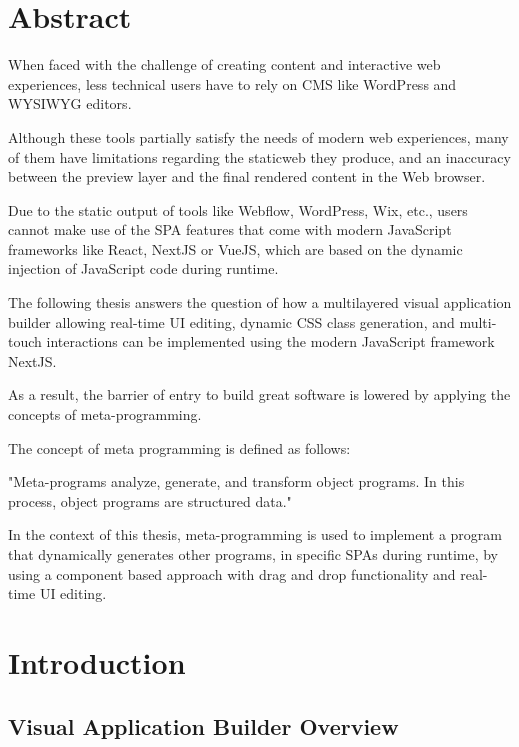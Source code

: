 \documentclass[oneside,11pt]{book}
\let\oldmainmatter\mainmatter
\renewcommand{\mainmatter}{
  \oldmainmatter
  \pagestyle{mainmatter}
}
\begin{document}
\chapter*{Abstract}

When faced with the challenge of creating content and interactive web experiences, less technical users have to rely on \gls{CMS} like WordPress and \gls{WYSIWYG} editors.


Although these tools partially satisfy the needs of modern web experiences, many of them have limitations regarding the \gls{staticweb} they produce, and an inaccuracy between the preview layer and the final rendered content in the Web browser.


Due to the static output of tools like Webflow, WordPress, Wix, etc., users cannot make use of the \gls{SPA} features that come with modern JavaScript frameworks like React, NextJS or VueJS, which are based on the dynamic injection of JavaScript code during \gls{runtime}.


The following thesis answers the question of how a multilayered visual application builder allowing real-time \gls{UI} editing, dynamic CSS class generation, and multi-touch interactions can be implemented using the modern JavaScript framework NextJS. 

As a result, the barrier of entry to build great software is lowered by applying the concepts of meta-programming.

The concept of meta programming is defined as follows:

"Meta-programs analyze, generate, and transform object programs. In this process, object programs are structured data."

In the context of this thesis, meta-programming is used to implement a program that dynamically generates other programs, in specific SPAs during \gls{runtime}, by using a component based approach with drag and drop functionality and real-time \gls{UI} editing.

\mainmatter

\chapter{Introduction}
\label{ch:introduction}

\section{Visual Application Builder Overview}
\label{sec:visual-builder-overview}
\end{document}
